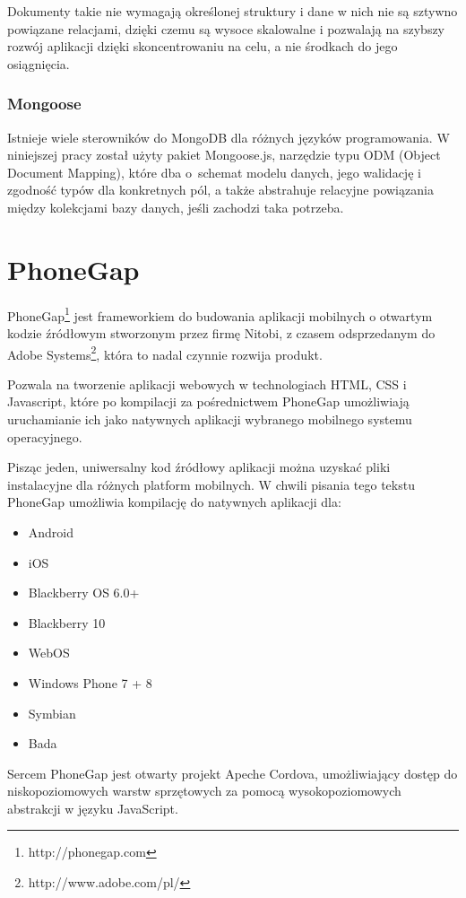 \documentclass[twoside,a4paper,openright,12pt]{book}
\begin{document}
Dokumenty takie nie wymagają określonej struktury i dane w nich nie są sztywno powiązane relacjami, dzięki czemu są wysoce skalowalne i pozwalają na szybszy rozwój aplikacji dzięki skoncentrowaniu na celu, a nie środkach do jego osiągnięcia.\cite{chodorow2013mongodb}

\subsubsection{Mongoose}

Istnieje wiele sterowników do MongoDB dla różnych języków programowania. W niniejszej pracy został użyty pakiet Mongoose.js, narzędzie typu ODM (Object Document Mapping), które dba o~schemat modelu danych, jego walidację i zgodność typów dla konkretnych pól, a także abstrahuje relacyjne powiązania między kolekcjami bazy danych, jeśli zachodzi taka potrzeba.


\section{PhoneGap}

PhoneGap\footnote{http://phonegap.com} jest frameworkiem do budowania aplikacji mobilnych o otwartym kodzie źródłowym stworzonym przez firmę Nitobi, z czasem odsprzedanym do Adobe Systems\footnote{http://www.adobe.com/pl/}, która to nadal czynnie rozwija produkt.

Pozwala na tworzenie aplikacji webowych w technologiach HTML, CSS i Javascript, które po kompilacji za pośrednictwem PhoneGap umożliwiają uruchamianie ich jako natywnych aplikacji wybranego mobilnego systemu operacyjnego. \cite{stark2013android}

Pisząc jeden, uniwersalny kod źródłowy aplikacji można uzyskać pliki instalacyjne dla różnych platform mobilnych. W chwili pisania tego tekstu PhoneGap umożliwia kompilację do natywnych aplikacji dla:
\begin{itemize}
	\item Android
	\item iOS
	\item Blackberry OS 6.0+
	\item Blackberry 10
	\item WebOS
	\item Windows Phone 7 + 8
	\item Symbian
	\item Bada
\end{itemize}

Sercem PhoneGap jest otwarty projekt Apeche Cordova, umożliwiający dostęp do niskopoziomowych warstw sprzętowych za pomocą wysokopoziomowych abstrakcji w języku JavaScript. 
\end{document}

